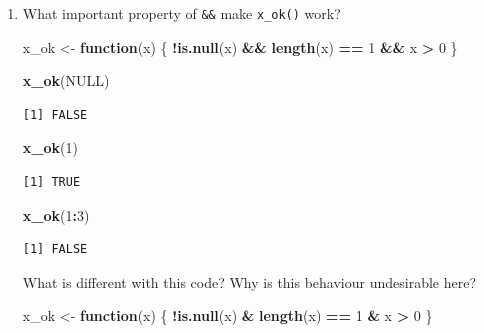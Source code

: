 \documentclass[]{book}
\newenvironment{Shaded}{\begin{snugshade}}{\end{snugshade}}
\newcommand{\ControlFlowTok}[1]{\textcolor[rgb]{0.13,0.29,0.53}{\textbf{#1}}}
\newcommand{\DecValTok}[1]{\textcolor[rgb]{0.00,0.00,0.81}{#1}}
\newcommand{\KeywordTok}[1]{\textcolor[rgb]{0.13,0.29,0.53}{\textbf{#1}}}
\newcommand{\NormalTok}[1]{#1}
\newcommand{\OperatorTok}[1]{\textcolor[rgb]{0.81,0.36,0.00}{\textbf{#1}}}
\newcommand{\OtherTok}[1]{\textcolor[rgb]{0.56,0.35,0.01}{#1}}
\newcommand{\StringTok}[1]{\textcolor[rgb]{0.31,0.60,0.02}{#1}}
\theoremstyle{definition}
\theoremstyle{definition}
\theoremstyle{definition}
\theoremstyle{remark}
\begin{document}
\begin{enumerate}
\def\labelenumi{\arabic{enumi}.}
\item
  What important property of \texttt{\&\&} make \texttt{x\_ok()} work?

\begin{Shaded}
\begin{Highlighting}[]
\NormalTok{x_ok <-}\StringTok{ }\ControlFlowTok{function}\NormalTok{(x) \{}
  \OperatorTok{!}\KeywordTok{is.null}\NormalTok{(x) }\OperatorTok{&&}\StringTok{ }\KeywordTok{length}\NormalTok{(x) }\OperatorTok{==}\StringTok{ }\DecValTok{1} \OperatorTok{&&}\StringTok{ }\NormalTok{x }\OperatorTok{>}\StringTok{ }\DecValTok{0}
\NormalTok{\}}

\KeywordTok{x_ok}\NormalTok{(}\OtherTok{NULL}\NormalTok{)}
\end{Highlighting}
\end{Shaded}

\begin{verbatim}
[1] FALSE
\end{verbatim}

\begin{Shaded}
\begin{Highlighting}[]
\KeywordTok{x_ok}\NormalTok{(}\DecValTok{1}\NormalTok{)}
\end{Highlighting}
\end{Shaded}

\begin{verbatim}
[1] TRUE
\end{verbatim}

\begin{Shaded}
\begin{Highlighting}[]
\KeywordTok{x_ok}\NormalTok{(}\DecValTok{1}\OperatorTok{:}\DecValTok{3}\NormalTok{)}
\end{Highlighting}
\end{Shaded}

\begin{verbatim}
[1] FALSE
\end{verbatim}

  What is different with this code? Why is this behaviour undesirable
  here?

\begin{Shaded}
\begin{Highlighting}[]
\NormalTok{x_ok <-}\StringTok{ }\ControlFlowTok{function}\NormalTok{(x) \{}
  \OperatorTok{!}\KeywordTok{is.null}\NormalTok{(x) }\OperatorTok{&}\StringTok{ }\KeywordTok{length}\NormalTok{(x) }\OperatorTok{==}\StringTok{ }\DecValTok{1} \OperatorTok{&}\StringTok{ }\NormalTok{x }\OperatorTok{>}\StringTok{ }\DecValTok{0}
\NormalTok{\}}


\end{Highlighting}
\end{Shaded}
\end{enumerate}
\end{document}
